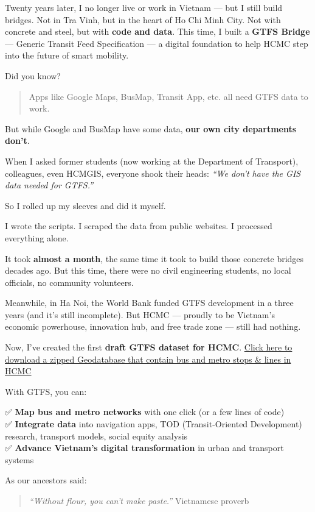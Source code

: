 \documentclass[
]{article}
\begin{document}
Twenty years later, I no longer live or work in Vietnam --- but I still
build bridges. Not in Tra Vinh, but in the heart of Ho Chi Minh City.
Not with concrete and steel, but with \textbf{code and data}. This time,
I built a \textbf{GTFS Bridge} --- Generic Transit Feed Specification
--- a digital foundation to help HCMC step into the future of smart
mobility.

Did you know?

\begin{quote}
Apps like Google Maps, BusMap, Transit App, etc. all need GTFS data to
work.
\end{quote}

But while Google and BusMap have some data, \textbf{our own city
departments don't}.

When I asked former students (now working at the Department of
Transport), colleagues, even HCMGIS, everyone shook their heads:
\emph{``We don't have the GIS data needed for GTFS.''}

So I rolled up my sleeves and did it myself.

I wrote the scripts. I scraped the data from public websites. I
processed everything alone.

It took \textbf{almost a month}, the same time it took to build those
concrete bridges decades ago. But this time, there were no civil
engineering students, no local officials, no community volunteers.

Meanwhile, in Ha Noi, the World Bank funded GTFS development in a three
years (and it's still incomplete). But HCMC --- proudly to be Vietnam's
economic powerhouse, innovation hub, and free trade zone --- still had
nothing.

Now, I've created the first \textbf{draft GTFS dataset for HCMC}.
\href{https://github.com/EnlightenedData/EDprofile/tree/master/data/HCMC_PTnetwork.gdb.zip}{Click
here to download a zipped Geodatabase that contain bus and metro stops
\& lines in HCMC}

With GTFS, you can:

✅ \textbf{Map bus and metro networks} with one click (or a few lines of
code)\\
✅ \textbf{Integrate data} into navigation apps, TOD (Transit-Oriented
Development) research, transport models, social equity analysis\\
✅ \textbf{Advance Vietnam's digital transformation} in urban and
transport systems

As our ancestors said:

\begin{quote}
\emph{``Without flour, you can't make paste.''} Vietnamese proverb
\end{quote}
\end{document}
